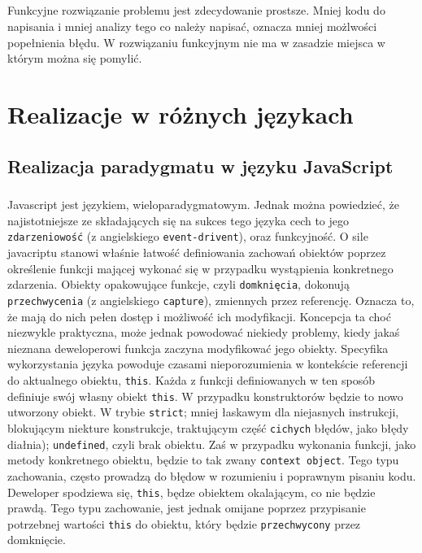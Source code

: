 \documentclass[a4paper,10pt]{report}
\begin{document}
\paragraph{}
Funkcyjne rozwiązanie problemu jest zdecydowanie prostsze. Mniej kodu do napisania i mniej analizy tego co należy napisać, oznacza mniej możlwości popełnienia błędu. W rozwiązaniu funkcyjnym nie ma w zasadzie miejsca w którym można się pomylić. 
\chapter{Realizacje w różnych językach}
\section{Realizacja paradygmatu w języku JavaScript}
\paragraph{}
Javascript jest językiem, wieloparadygmatowym. Jednak można powiedzieć, że najistotniejsze ze składających się na sukces tego języka cech to jego \verb|zdarzeniowość| (z angielskiego \verb|event-drivent|), oraz funkcyjność. O sile javacriptu stanowi właśnie łatwość definiowania zachowań obiektów poprzez określenie funkcji mającej wykonać się w przypadku wystąpienia konkretnego zdarzenia. Obiekty opakowujące funkcje, czyli \verb|domknięcia|, dokonują \verb|przechwycenia| (z angielskiego \verb|capture|), zmiennych przez referencję. Oznacza to, że mają do nich pełen dostęp i możliwość ich modyfikacji. Koncepcja ta choć niezwykle praktyczna, może jednak powodować niekiedy problemy, kiedy jakaś nieznana deweloperowi funkcja zaczyna modyfikować jego obiekty. Specyfika wykorzystania języka powoduje czasami nieporozumienia w kontekście referencji do aktualnego obiektu, \verb|this|. Każda z funkcji definiowanych w ten sposób definiuje swój własny obiekt \verb|this|. W przypadku konstruktorów będzie to nowo utworzony obiekt. W trybie \verb|strict|; mniej łaskawym dla niejasnych instrukcji, blokującym niekture konstrukcje, traktującym część \verb|cichych| błędów, jako błędy diałnia); \verb|undefined|, czyli brak obiektu. Zaś w przypadku wykonania funkcji, jako metody konkretnego obiektu, będzie to tak zwany \verb|context object|. Tego typu zachowania, często prowadzą do błędow w rozumieniu i poprawnym pisaniu kodu. Deweloper spodziewa się, \verb|this|, będze obiektem okalającym, co nie będzie prawdą. Tego typu zachowanie, jest jednak omijane poprzez przypisanie potrzebnej wartości \verb|this| do obiektu, który będzie \verb|przechwycony| przez domknięcie.
\end{document}
